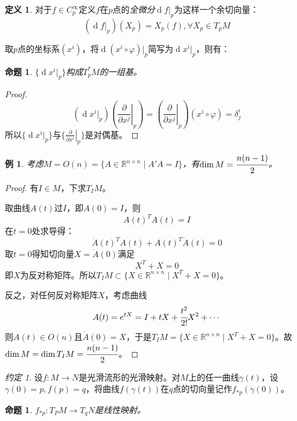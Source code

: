 \documentclass[winfonts,UTF8,c5size,a4paper,fancyhdr,hyperref,titlepage,nocap]{ctexart}
\newtheorem{prop}[thm]{命题}
\newtheorem{exa}[thm]{例}
\theoremstyle{definition}
\newtheorem{defn}[thm]{定义}
\theoremstyle{remark}
\newtheorem*{note}{约定}
\numberwithin{equation}{subsection}
\newcommand{\Real}{\mathbb{R}}
\newcommand{\red}{\color{red}}
\newcommand{\dd}{\operatorname{d}}
\newcommand{\pfrac}[2]{\frac{\partial{#1}}{\partial{#2}}}
\newcommand{\px}[1]{\left.\pfrac{}{x^{#1}}\right|_p}
\begin{document}
\begin{defn}
对于$f\in C^{\infty}_p$定义$f$在$p$点的\emph{\red 全微分}$\dd f|_p$为这样一个余切向量：
\begin{equation*}
(\dd f|_p)(X_p)=X_p(f),\forall X_p\in T_pM
\end{equation*}
\end{defn}
取$p$点的坐标系$(x^i)$，将$\dd(x^i\circ\varphi)|_p$简写为$\dd x^i|_p$，则有：
\begin{prop}
  $\{\dd x^i|_p\}$构成$T^{\ast}_pM$的一组基。
\end{prop}
\begin{proof}
  \begin{equation*}
  (\dd x^i|_p)(\px{j})=(\px{j})(x^i\circ\varphi)=\delta^i_j
  \end{equation*}
所以$\{\dd x^i|_p\}$与$\{\px{i}\}$是对偶基。
\end{proof}
\begin{exa}
考虑$M=O(n)=\{A\in\Real^{n\times n}\mid A'A=I\}$，有$\dim M=\cfrac{n(n-1)}{2}$。
\end{exa}
\begin{proof}
  有$I\in M$，下求$T_IM$。

取曲线$A(t)$过$I$，即$A(0)=I$，则
\begin{equation*}
A(t)^{T}A(t)=I
\end{equation*}
在$t=0$处求导得：
\begin{equation*}
\dot{A}(t)^{T}A(t)+A(t)^{T}\dot{A}(t)=0
\end{equation*}
取$t=0$得知切向量$X=\dot{A}(0)$满足
\begin{equation*}
X^{T}+X=0
\end{equation*}
即$X$为反对称矩阵。所以$T_IM\subset\{X\in\Real^{n\times n}\mid X^{T}+X=0\}$。

反之，对任何反对称矩阵$X$，考虑曲线
\begin{equation*}
A(t)=e^{tX}=I+tX+\cfrac{t^2}{2!}X^2+\cdots
\end{equation*}
则$A(t)\in O(n)$且$\dot{A}(0)=X$，于是$T_IM=\{X\in\Real^{n\times n}\mid X^{T}+X=0\}$。故$\dim M=\dim T_IM=\cfrac{n(n-1)}{2}$。
\end{proof}
\begin{note}
  设$f\colon M\to N$是光滑流形的光滑映射。对$M$上的任一曲线$\gamma(t)$，设$\gamma(0)=p,f(p)=q$，将曲线$f(\gamma(t))$在$q$点的切向量记作$f_{\ast p}(\dot{\gamma}(0))$。
\end{note}
\begin{prop}
  $f_{\ast p}\colon T_PM\to T_qN$是线性映射。
\end{prop}
\end{document}
